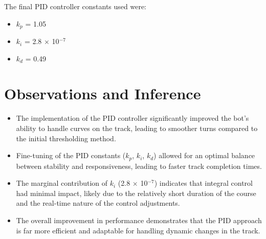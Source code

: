 \documentclass{article}
\begin{document}
The final PID controller constants used were:
\begin{itemize}[noitemsep]
    \item $k_p$ = 1.05
    \item $k_i$ = 2.8 $\times$ 10$^{-7}$
    \item $k_d$ = 0.49
\end{itemize}

\section{Observations and Inference}

\begin{itemize}[noitemsep]
    \item The implementation of the PID controller significantly improved the bot's ability to handle curves on the track, leading to smoother turns compared to the initial thresholding method.
    \item Fine-tuning of the PID constants ($k_p$, $k_i$, $k_d$) allowed for an optimal balance between stability and responsiveness, leading to faster track completion times.
    \item The marginal contribution of $k_i$ (2.8 $\times$ 10$^{-7}$) indicates that integral control had minimal impact, likely due to the relatively short duration of the course and the real-time nature of the control adjustments.
    \item The overall improvement in performance demonstrates that the PID approach is far more efficient and adaptable for handling dynamic changes in the track.
\end{itemize}
\end{document}
